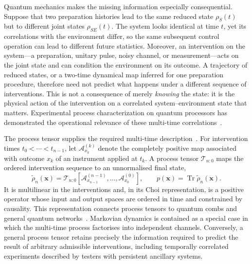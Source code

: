 Quantum mechanics makes the missing information especially consequential.  Suppose that two preparation histories lead to the same reduced state $\rho_S(t)$ but to different joint states $\rho_{SE}(t)$.  The system looks identical at time $t$, yet its correlations with the environment differ, so the same subsequent control operation can lead to different future statistics.  Moreover, an intervention on the system---a preparation, unitary pulse, noisy channel, or measurement---acts on the joint state and can condition the environment on its outcome.  A trajectory of reduced states, or a two-time dynamical map inferred for one preparation procedure, therefore need not predict what happens under a different sequence of interventions.  This is not a consequence of merely \emph{knowing} the state: it is the physical action of the intervention on a correlated system--environment state that matters.  Experimental process characterization on quantum processors has demonstrated the operational relevance of these multi-time correlations~\cite{White2020}.

The process tensor supplies the required multi-time description~\cite{Pollock2018Framework,Pollock2018Markov,Milz2021}.  For intervention times $t_0<\cdots<t_{n-1}$, let $\mathcal{A}_{x_k}^{(k)}$ denote the completely positive map associated with outcome $x_k$ of an instrument applied at $t_k$.  A process tensor $\mathcal{T}_{n:0}$ maps the ordered intervention sequence to an unnormalised final state,
\begin{equation}
    \widetilde{\rho}_n(\boldsymbol{x})
    =\mathcal{T}_{n:0}
      \!\left[
      \mathcal{A}_{x_{n-1}}^{(n-1)},\ldots,
      \mathcal{A}_{x_0}^{(0)}
      \right],
    \qquad
    p(\boldsymbol{x})=\operatorname{Tr}\widetilde{\rho}_n(\boldsymbol{x}).
    \label{eq:process-tensor-action}
\end{equation}
It is multilinear in the interventions and, in its Choi representation, is a positive operator whose input and output spaces are ordered in time and constrained by causality.  This representation connects process tensors to quantum combs and general quantum networks~\cite{Chiribella2009}.  Markovian dynamics is contained as a special case in which the multi-time process factorises into independent channels.  Conversely, a general process tensor retains precisely the information required to predict the result of arbitrary admissible interventions, including temporally correlated experiments described by testers with persistent ancillary systems.

